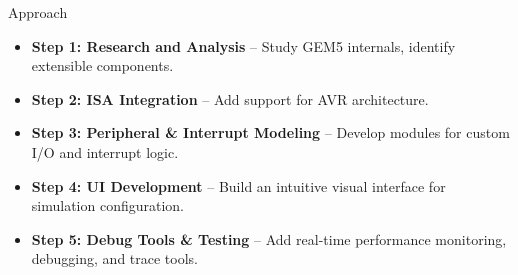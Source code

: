 \begin{frame}{Approach}
  \begin{itemize}
    \item \textbf{Step 1: Research and Analysis} – Study GEM5 internals, identify extensible components.
    \item \textbf{Step 2: ISA Integration} – Add support for AVR architecture.
    \item \textbf{Step 3: Peripheral \& Interrupt Modeling} – Develop modules for custom I/O and interrupt logic.
    \item \textbf{Step 4: UI Development} – Build an intuitive visual interface for simulation configuration.
    \item \textbf{Step 5: Debug Tools \& Testing} – Add real-time performance monitoring, debugging, and trace tools.
  \end{itemize}
\end{frame}
